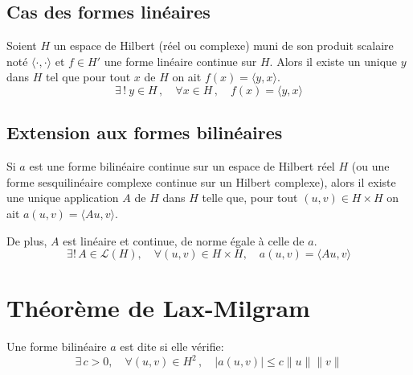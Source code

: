 \medskip
\subsection{Cas des formes linéaires}

\begin{theoreme}
Soient $H$ un espace de Hilbert (réel ou complexe) muni de son produit scalaire noté
$\langle\cdot,\cdot\rangle$ et $f \in H'$ une forme linéaire continue sur $H$.
Alors il existe un unique $y$ dans $H$ tel que pour tout $x$ de $H$ on ait $f(x)=\langle y,x\rangle$.
\begin{equation}
\exists\,!\ y \in H\,, \quad \forall x\in H\,, \quad f(x) = \langle y,x\rangle
\end{equation}
\end{theoreme}

\medskip
\subsection{Extension aux formes bilinéaires}

%
Si $a$ est une forme bilinéaire continue sur un espace de Hilbert réel $H$ (ou une forme
sesquilinéaire complexe continue sur un Hilbert complexe), alors il existe une unique application
$A$ de $H$ dans $H$ telle que, pour tout $(u,v)\in H\times H$ on ait
$a(u,v)=\langle Au,v \rangle$.

De plus, $A$ est linéaire et continue, de norme égale à celle de $a$.
\begin{equation}
\exists !\,A\in \mathcal{L}(H),\quad \forall (u,v)\in H\times H,\quad a(u,v)=\langle Au,v \rangle
\end{equation}

\medskip
\section{Théorème de Lax-Milgram}\label{Sec-ThLaxMilgram}\label{Sec:LaxMil}

\medskip
\begin{definition}
Une forme bilinéaire $a$ est dite  si elle vérifie:
\begin{equation}
\exists\,c>0,\quad \forall (u,v)\in H^2\,,\quad |a(u,v)|\leq c\|u\|\|v\|
\end{equation}
\end{definition}

